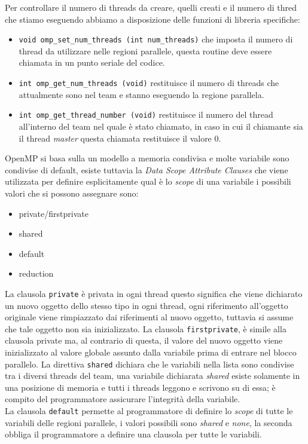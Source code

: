 Per controllare il numero di threads da creare, quelli creati e il numero di thred che stiamo eseguendo abbiamo a disposizione delle funzioni di libreria specifiche:
\begin{itemize}
	\item  \texttt{void omp\_set\_num\_threads (int num\_threads)} che imposta il numero di thread da utilizzare nelle regioni parallele, questa routine deve essere chiamata in un punto seriale del codice.
	\item \texttt{int omp\_get\_num\_threads (void)} restituisce il numero di threads che attualmente sono nel team e stanno eseguendo la regione parallela.
	\item \texttt{int omp\_get\_thread\_number (void)} restituisce il numero del thread  all'interno del team nel quale è stato chiamato, in caso in cui il chiamante sia il thread \emph{master} questa chiamata restituisce il valore $0$.
\end{itemize}
OpenMP si basa sulla un modello a memoria condivisa e molte variabile sono condivise di default, esiste tuttavia la \emph{Data Scope Attribute Clauses} che viene utilizzata per definire esplicitamente qual è lo \emph{scope} di una variabile i possibili valori che si possono assegnare sono:
\begin{itemize}
	\item private/firstprivate
	\item shared
	\item default
	\item reduction
\end{itemize}
La clausola \texttt{private} è privata in ogni thread questo significa che viene dichiarato un nuovo oggetto dello stesso tipo in ogni thread, ogni riferimento all'oggetto originale viene rimpiazzato dai riferimenti al nuovo oggetto, tuttavia si assume che tale oggetto non sia inizializzato. La clausola \texttt{firstprivate}, è simile alla clausola private ma, al contrario di questa, il valore del nuovo oggetto viene inizializzato al valore globale assunto dalla variabile prima di entrare nel blocco parallelo.
La direttiva \texttt{shared} dichiara che le variabili nella lista sono condivise tra i diversi threads del team, una variabile dichiarata \emph{shared} esiste solamente in una posizione di memoria e tutti i threads leggono e scrivono su di essa; è compito del programmatore assicurare l'integrità della variabile.\\
La clausola \texttt{default} permette al programmatore di definire lo \emph{scope} di tutte le variabili delle regioni parallele, i valori possibili sono \emph{shared} e \emph{none}, la seconda obbliga il programmatore a definire una clausola per tutte le variabili.
